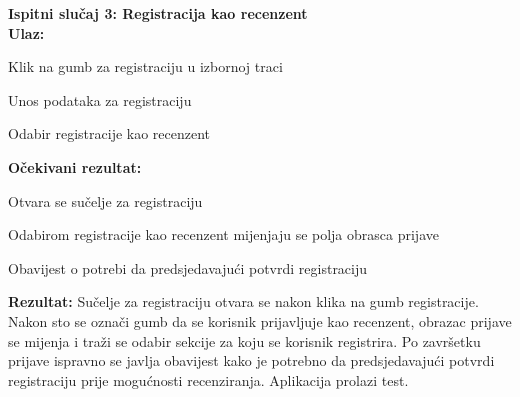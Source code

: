 			
			 \textbf{Ispitni slučaj 3: Registracija kao recenzent}\\
			 \textbf{Ulaz:}
			 \begin{packed_item}
			 	\item {Klik na gumb za registraciju u izbornoj traci}
			 	\item {Unos podataka za registraciju}
			 	\item {Odabir registracije kao recenzent}
			 \end{packed_item}
			 \textbf{Očekivani rezultat:}
			 \begin{packed_item}
			 	\item {Otvara se sučelje za registraciju}
			 	\item {Odabirom registracije kao recenzent mijenjaju se polja obrasca prijave}
			 	\item {Obavijest o potrebi da predsjedavajući potvrdi registraciju}
			 \end{packed_item}
			 \textbf{Rezultat: }Sučelje za registraciju otvara se nakon klika na gumb registracije. Nakon sto se označi gumb da se korisnik prijavljuje kao recenzent, obrazac prijave se mijenja i traži se odabir sekcije za koju se korisnik registrira. Po završetku prijave ispravno se javlja obavijest kako je potrebno da predsjedavajući potvrdi registraciju prije mogućnosti recenziranja. Aplikacija prolazi test.\\
			
